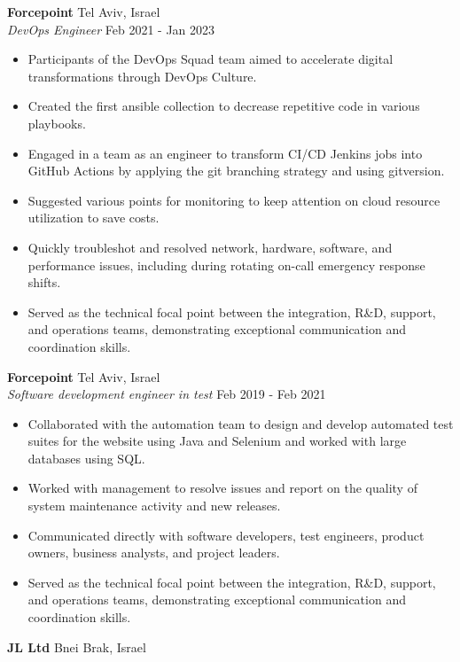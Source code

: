 \documentclass[a4paper]{article}
\begin{document}
\textbf{Forcepoint} \hfill Tel Aviv, Israel\\
\textit{DevOps Engineer} \hfill Feb 2021 - Jan 2023\\
\vspace{-1mm}
\begin{itemize} \itemsep 1pt
	\item Participants of the DevOps Squad team aimed to accelerate digital transformations through DevOps Culture.
	\item 	Created the first ansible collection to decrease repetitive code in various playbooks.
	\item 	Engaged in a team as an engineer to transform CI/CD Jenkins jobs into GitHub Actions by applying the git branching strategy and using gitversion.
	\item 	Suggested various points for monitoring to keep attention on cloud resource utilization to save costs.
	\item 	Quickly troubleshot and resolved network, hardware, software, and performance issues, including during rotating on-call emergency response shifts.
	\item 	Served as the technical focal point between the integration, R\&D, support, and operations teams, demonstrating exceptional communication and coordination skills.
\end{itemize}
\textbf{Forcepoint} \hfill Tel Aviv, Israel\\
\textit{Software development engineer in test} \hfill Feb 2019 - Feb 2021\\
\vspace{-1mm}
\begin{itemize} \itemsep 1pt
	\item 	Collaborated with the automation team to design and develop automated test suites for the website using Java and Selenium and worked with large databases using SQL.
	\item 	Worked with management to resolve issues and report on the quality of system maintenance activity and new releases.
	\item 	Communicated directly with software developers, test engineers, product owners, business analysts, and project leaders.
	\item 	Served as the technical focal point between the integration, R\&D, support, and operations teams, demonstrating exceptional communication and coordination skills.
\end{itemize}
\textbf{JL Ltd} \hfill Bnei Brak, Israel\\
\end{document}
